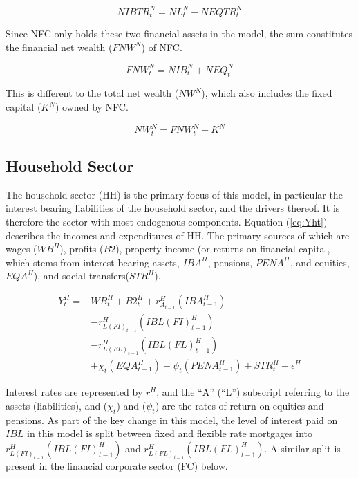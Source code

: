 \documentclass[
]{book}
\begin{document}
\begin{equation}
NIBTR^N_t = NL^N_t - NEQTR^N_t
\end{equation}

Since NFC only holds these two financial assets in the model, the sum constitutes the
financial net wealth (\(FNW^N\)) of NFC.

\begin{equation}
FNW^N_t = NIB^N_t + NEQ^N_t
\end{equation}

This is different to the total net wealth (\(NW^N\)), which also includes the fixed capital
(\(K^N\)) owned by NFC.

\begin{equation}
NW^N_t = FNW^N_t + K^N
\end{equation}

\hypertarget{sec:fi-fl-sfc-model-eq-hh}{%
\subsection{Household Sector}\label{sec:fi-fl-sfc-model-eq-hh}}

The household sector (HH) is the primary focus of this model, in particular the interest bearing
liabilities of the household sector, and the drivers thereof. It is therefore the sector with
most endogenous components. Equation (\ref{eq:Yht}) describes the incomes and expenditures
of HH. The primary sources of which are wages (\(WB^H\)), profits (\(B2\)), property income
(or returns on financial capital, which stems from interest bearing assets, \(IBA^H\),
pensions, \(PENA^H\), and equities, \(EQA^H\)), and social transfers(\(STR^H\)).

\begin{equation}
\begin{split}
Y^H_t = & WB^H_t + B2^H_{t} + r^H_{A_{t-1}}(IBA^H_{t-1})\\
        & - r^H_{L(FI)_{t-1}}(IBL(FI)^H_{t-1})\\
        & - r^H_{L(FL)_{t-1}}(IBL(FL)^H_{t-1})\\
        & + \chi _t(EQA^H_{t-1}) + \psi _t(PENA^H_{t-1}) + STR^H_t + \epsilon ^H
\label{eq:Yht}
\end{split}
\end{equation}

Interest rates are represented by \(r^H\), and the ``A'' (``L'') subscript referring to the assets (liabilities), and (\(\chi _t\)) and (\(\psi _t\)) are the rates of return on equities and pensions. As part of the key change in this model, the level of interest paid on \(IBL\) in this model is split between fixed and flexible rate mortgages into \(r^H_{L(FI)_{t-1}}(IBL(FI)^H_{t-1})\) and \(r^H_{L(FL)_{t-1}}(IBL(FL)^H_{t-1})\). A similar split is present in the financial corporate sector (FC) below.
\end{document}
